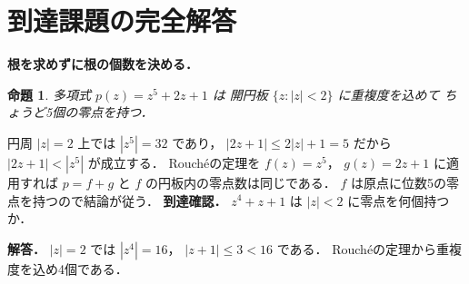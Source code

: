 \documentclass[a5paper,10pt,onecolumn]{jsarticle}
\makeatletter
\theoremstyle{mathnotetheorem}
\newtheorem{proposition}[theorem]{命題}
\renewcommand{\proofname}{証明}
\renewenvironment{proof}[1][\proofname]{%
  \par\pushQED{\qed}\normalfont\topsep4\p@\@plus2\p@\relax
  \trivlist\item[\hskip\labelsep\bfseries #1]\ignorespaces
}{\popQED\endtrivlist\@endpefalse}
\makeatother
\begin{document}
\section{到達課題の完全解答}
\noindent\textbf{根を求めずに根の個数を決める．}
\begin{proposition}
多項式 $p(z)=z^5+2z+1$ は
開円板 $\{z:|z|<2\}$ に重複度を込めて
ちょうど5個の零点を持つ．
\end{proposition}
\begin{proof}
円周 $|z|=2$ 上では
$|z^5|=32$ であり，
$|2z+1|\le2|z|+1=5$ だから
$|2z+1|<|z^5|$ が成立する．
Rouchéの定理を $f(z)=z^5$，
$g(z)=2z+1$ に適用すれば
$p=f+g$ と $f$ の円板内の零点数は同じである．
$f$ は原点に位数5の零点を持つので結論が従う．
\end{proof}
\noindent\textbf{到達確認．}
$z^4+z+1$ は $|z|<2$ に零点を何個持つか．
\par\noindent\textbf{解答．}
$|z|=2$ では $|z^4|=16$，
$|z+1|\le3<16$ である．
Rouchéの定理から重複度を込め4個である．
\end{document}
